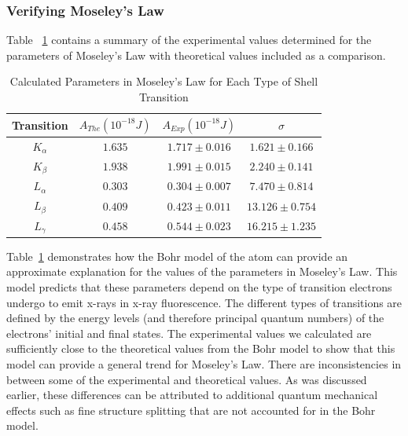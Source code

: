 \documentclass[%
 reprint,
 amsmath,amssymb,
 aps,
 pra,
]{revtex4-1}
\begin{document}
\subsubsection{Verifying Moseley's Law}

Table ~\ref{Tab:MoseLawSummary} contains a summary of the experimental values determined for the parameters of Moseley's Law with theoretical values included as a comparison.

\begin{table}[htbp]
	\begin{center}
		\begin{tabular}{|c|c|c|c|}
			\hline Transition & $A_{The} (10^{-18} J)$  & $A_{Exp} (10^{-18} J) $ & $\sigma$ \\
			\hline $K_{\alpha}$ & $1.635$ & $1.717 \pm 0.016$ & $1.621 \pm 0.166$ \\
			\hline $K_{\beta}$ & $1.938$ & $1.991 \pm 0.015$ & $2.240 \pm 0.141$ \\
			\hline $L_{\alpha}$ & $0.303$ & $0.304 \pm 0.007$ & $7.470 \pm 0.814$ \\
			\hline $L_{\beta}$ & $0.409$ & $0.423 \pm 0.011$ & $13.126 \pm 0.754$ \\
			\hline $L_{\gamma}$ & $0.458$ & $0.544 \pm 0.023$ & $16.215 \pm 1.235$ \\
			\hline
		\end{tabular}
	\end{center}
	\caption{Calculated Parameters in Moseley's Law for Each Type of Shell Transition}
	\label{Tab:MoseLawSummary}
\end{table}

Table~\ref{Tab:MoseLawSummary} demonstrates how the Bohr model of the atom can provide an approximate explanation for the values of the parameters in Moseley's Law. This model predicts that these parameters depend on the type of transition electrons undergo to emit x-rays in x-ray fluorescence. The different types of transitions are defined by the energy levels (and therefore principal quantum numbers) of the electrons' initial and final states. The experimental values we calculated are sufficiently close to the theoretical values from the Bohr model to show that this model can provide a general trend for Moseley's Law. There are inconsistencies in between some of the experimental and theoretical values. As was discussed earlier, these differences can be attributed to additional quantum mechanical effects such as fine structure splitting that are not accounted for in the Bohr model.
\end{document}
